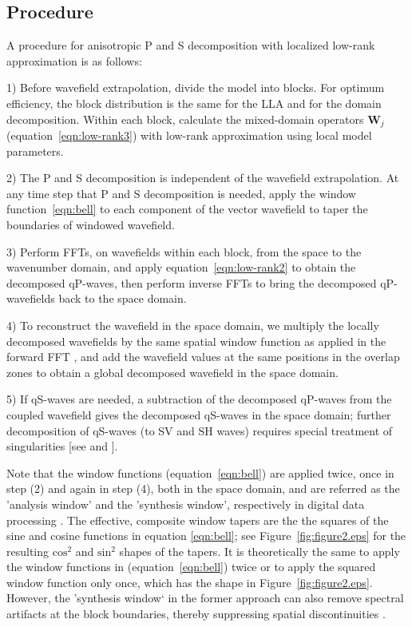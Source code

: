 \documentclass[manuscript,ulem,graphix,revised]{geophysics}
\begin{document}
\subsection{Procedure}
\indent\indent
A procedure for anisotropic P and S decomposition with localized low-rank approximation is as follows:
\begin{hangparas}{.25in}{1}

1) Before wavefield extrapolation, divide the model into blocks. For optimum efficiency, the block distribution is the same for the LLA and for the domain decomposition.  Within each block, calculate the mixed-domain operators $\boldsymbol{W}_j$ (equation~\ref{eqn:low-rank3}) with low-rank approximation using local model parameters.

2) The P and S decomposition is independent of the wavefield extrapolation. At any time step that P and S decomposition is needed, apply the window function~\ref{eqn:bell} to each component of the vector wavefield to taper the boundaries of windowed wavefield.

3) Perform FFTs, on wavefields within each block, from the space to the wavenumber domain, and apply equation~\ref{eqn:low-rank2} to obtain the decomposed qP-waves, then perform inverse FFTs to bring the decomposed qP-wavefields back to the space domain.


4) To reconstruct the wavefield in the space domain, we multiply the locally decomposed wavefields by the same spatial window function as applied in the forward FFT \citep{crochiere80}, and add the wavefield values at the same positions in the overlap zones to obtain a global decomposed wavefield in the space domain.

5) If qS-waves are needed, a subtraction of the decomposed qP-waves from the coupled wavefield gives the decomposed qS-waves in the space domain; further decomposition of qS-waves (to SV and SH waves) requires special treatment of singularities [see \citet{cheng14} and \citet{Sripanich16}].
\end{hangparas}

Note that the window functions (equation~\ref{eqn:bell}) are applied twice, once in step (2) and again in step (4), both in the space domain, and are referred as the 'analysis window' and the 'synthesis window', respectively in digital data processing \mbox{\citep{julius11}}. The effective, composite window tapers are the the squares of the sine and cosine functions in equation \ref{eqn:bell}; see Figure~\ref{fig:figure2.eps} for the resulting $\mathrm{cos^2}$ and $\mathrm{sin^2}$ shapes of the tapers. It is theoretically the same to apply the window functions in (equation~\ref{eqn:bell}) twice or to apply the squared window function only once, which has the shape in Figure~\ref{fig:figure2.eps}. However, the 'synthesis window` in the former approach can also remove spectral artifacts at the block boundaries, thereby suppressing spatial discontinuities \mbox{\citep{julius11}}. 
\end{document}
